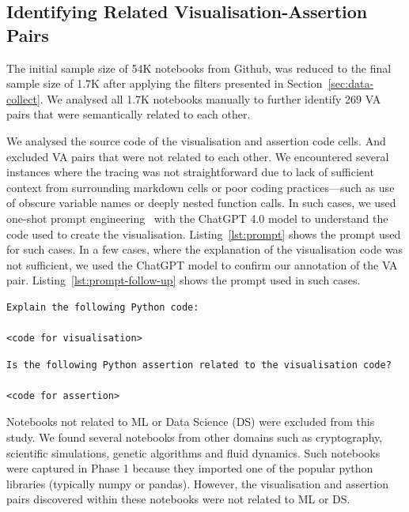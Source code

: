 \documentclass[conference]{IEEEtran}
\begin{document}
\subsection{Identifying Related Visualisation-Assertion Pairs}\label{sec:identify-related-pairs}

The initial sample size of 54K notebooks from Github, was reduced to the final sample size of 1.7K after applying the filters presented in Section~\ref{sec:data-collect}. We analysed all 1.7K notebooks manually to further identify 269 VA pairs that were semantically related to each other.

We analysed the source code of the visualisation and assertion code cells. And excluded VA pairs that were not related to each other. We encountered several instances where the tracing was not straightforward due to lack of sufficient context from surrounding markdown cells or poor coding practices---such as use of obscure variable names or deeply nested function calls. In such cases, we used one-shot prompt engineering~\cite{liu2023pretrain} with the ChatGPT 4.0 model to understand the code used to create the visualisation. Listing~\ref{lst:prompt} shows the prompt used for such cases. In a few cases, where the explanation of the visualisation code was not sufficient, we used the ChatGPT model to confirm our annotation of the VA pair. Listing~\ref{lst:prompt-follow-up} shows the prompt used in such cases.

\begin{lstlisting}[caption={Prompt used for ChatGPT 4.0 model to understand visualisation code.}, label={lst:prompt}]
Explain the following Python code:

<code for visualisation>

\end{lstlisting}

\begin{lstlisting}[caption={Prompt used for ChatGPT 4.0 model to confirm if a VA pair are related to each other.}, label={lst:prompt-follow-up}]
Is the following Python assertion related to the visualisation code?

<code for assertion>

\end{lstlisting}

Notebooks not related to ML or Data Science (DS) were excluded from this study. We found several notebooks from other domains such as cryptography, scientific simulations, genetic algorithms and fluid dynamics. Such notebooks were captured in Phase 1 because they imported one of the popular python libraries (typically numpy or pandas). However, the visualisation and assertion pairs discovered within these notebooks were not related to ML or DS.
\end{document}
